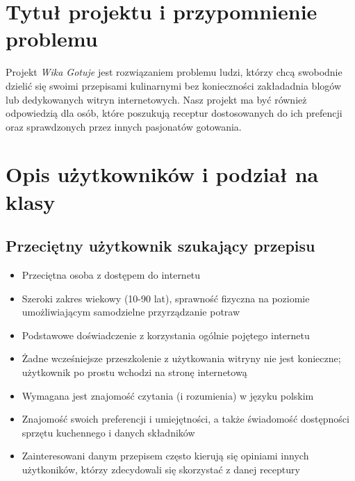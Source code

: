 \documentclass{article}
\begin{document}
\section{Tytuł projektu i przypomnienie problemu}
Projekt \textit{Wika Gotuje} jest rozwiązaniem problemu ludzi, którzy chcą swobodnie dzielić się swoimi przepisami kulinarnymi bez konieczności zakładadnia blogów lub dedykowanych 
  witryn internetowych. Nasz projekt ma być również odpowiedzią dla osób, które poszukują receptur dostosowanych do ich prefencji oraz sprawdzonych przez innych pasjonatów gotowania.

\section{Opis użytkowników i podział na klasy}
\subsection{Przeciętny użytkownik szukający przepisu}
  \begin{itemize}
    \item Przeciętna osoba z dostępem do internetu
    \item Szeroki zakres wiekowy (10-90 lat), sprawność fizyczna na poziomie umożliwiającym samodzielne przyrządzanie potraw
    \item Podstawowe doświadczenie z korzystania ogólnie pojętego internetu
    \item Żadne wcześniejsze przeszkolenie z użytkowania witryny nie jest konieczne; użytkownik po prostu wchodzi na stronę internetową
    \item Wymagana jest znajomość czytania (i rozumienia) w języku polskim
    \item Znajomość swoich preferencji i umiejętności, a także świadomość dostępności sprzętu kuchennego i danych składników
    \item Zainteresowani danym przepisem często kierują się opiniami innych użytkoników, którzy zdecydowali się skorzystać z danej receptury
  \end{itemize}
\end{document}
